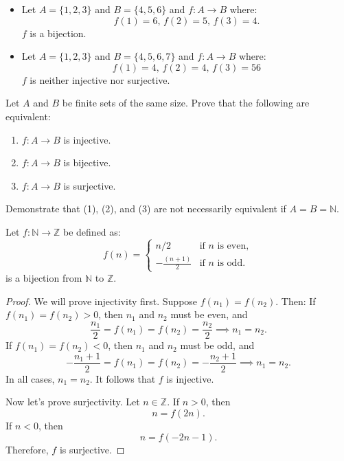 \documentclass[11pt, draft]{article}
\begin{document}
\begin{itemize}
    \item Let $A = \{1, 2, 3\}$ and $B = \{4, 5, 6\}$ and $f : A \to B$ where:
          \[
              f(1) = 6, \, f(2) = 5, \, f(3) = 4.
          \]
          $f$ is a bijection.
    \item Let $A = \{1, 2, 3\}$ and $B = \{4, 5, 6, 7\}$ and $f : A \to B$ where:
          \[
              f(1) = 4, \, f(2) = 4, \, f(3) = 56
          \]
          $f$ is neither injective nor surjective.

\end{itemize}
\begin{question*}
    Let $A$ and $B$ be finite sets of the same size. Prove that the following are
    equivalent:
    \begin{enumerate}
        \item $f : A \to B$ is injective.
        \item $f : A \to B$ is bijective.
        \item $f : A \to B$ is surjective.
    \end{enumerate}
    Demonstrate that (1), (2), and (3) are not necessarily equivalent if $A = B = \mathbb{N}$.
\end{question*}
\begin{example}
    Let $f : \mathbb{N} \to \mathbb{Z}$ be defined as:
    \[
        f(n) =
        \begin{cases}
            n / 2              & \text{if } n \text{ is even}, \\
            -\frac{(n + 1)}{2} & \text{if } n \text{ is odd}.
        \end{cases}
    \]
    is a bijection from $\mathbb{N}$ to $\mathbb{Z}$.
\end{example}
\begin{proof}
    We will prove injectivity first. Suppose \( f(n_1) = f(n_2) \). Then:
    If \( f(n_1) = f(n_2) > 0 \), then \( n_1 \) and \( n_2 \) must be even, and
    \[
        \frac{n_1}{2} = f(n_1) = f(n_2) = \frac{n_2}{2} \implies n_1 = n_2.
    \]
    If \( f(n_1) = f(n_2) < 0 \), then \( n_1 \) and \( n_2 \) must be odd, and
    \[
        -\frac{n_1 + 1}{2} = f(n_1) = f(n_2) = -\frac{n_2 + 1}{2} \implies n_1 = n_2.
    \]
    In all cases, \( n_1 = n_2 \). It follows that \( f \) is injective.

    Now let's prove surjectivity. Let \( n \in \mathbb{Z} \). If \( n > 0 \), then
    \[
        n = f(2n).
    \]
    If \( n < 0 \), then
    \[
        n = f(-2n - 1).
    \]
    Therefore, \( f \) is surjective.
\end{proof}
\end{document}
